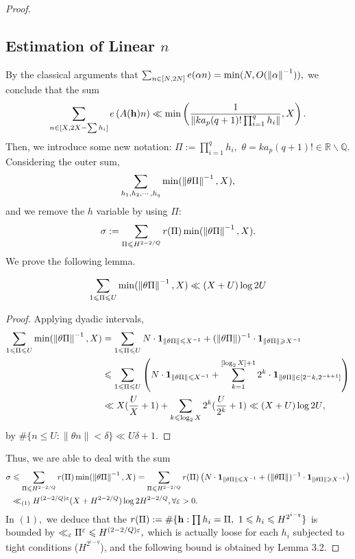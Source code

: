 \begin{proof}
\subsection{Estimation of Linear $n$}
By the classical arguments that $\sum_{n \in [N,2N]} e(\alpha n) = \min(N, O(\left\lVert \alpha \right\rVert^{-1})),$ we conclude that the sum $$\sum_{n \in [X,2X-\sum h_i]} e\left( A(\mathbf{h}) n \right) \ll \min \left( \frac{1}{\left\lVert ka_p (q+1)! \prod_{i=1}^q h_i \right\rVert}, X \right).$$ Then, we introduce some new notation: $\Pi := \prod_{i=1}^q h_i,$ $\theta = ka_p (q+1)! \in \mathbb{R} \backslash \mathbb{Q}.$ Considering the outer sum, $$\sum_{h_1,h_2, \cdots ,h_q} \min(\left\lVert \theta\Pi \right\rVert^{-1}, X),$$ and we remove the $h$ variable by using $\Pi$: $$\sigma := \sum_{\Pi \leqslant H^{2-2/Q}} r(\Pi) \min(\left\lVert \theta\Pi \right\rVert^{-1}, X).$$ We prove the following lemma.
\begin{lemma}
    $$\sum_{1 \leqslant \Pi \leqslant U} \min(\left\lVert \theta\Pi \right\rVert^{-1}, X) \ll (X+U)\log 2U$$
\end{lemma}
\begin{proof}
Applying dyadic intervals, 
\begin{align*}
    \sum_{1 \leqslant \Pi \leqslant U} \min(\left\lVert \theta\Pi \right\rVert^{-1}, X) &= \sum_{1 \leqslant \Pi \leqslant U} N \cdot \mathbf{1}_{\left\lVert \theta\Pi \right\rVert \leqslant X^{-1}} + (\left\lVert \theta\Pi \right\rVert)^{-1} \cdot \mathbf{1}_{\left\lVert \theta\Pi \right\rVert \geqslant X^{-1}} \\
    &\leqslant \sum_{1 \leqslant \Pi \leqslant U} \left( N \cdot \mathbf{1}_{\left\lVert \theta\Pi \right\rVert \leqslant X^{-1}} + \sum_{k = 1}^{[\log_2X]+1} 2^k \cdot \mathbf{1}_{\left\lVert \theta\Pi \right\rVert \in [2^-k,2^{-k+1}]} \right) \\ 
    &\ll X(\frac{U}{X}+1) + \sum_{k \leqslant \log_2X} 2^k (\frac{U}{2^k}+1) \ll (X+U)\log{2U},
\end{align*}
by $\#\{n\le U: \|\theta n\|<\delta\} \ll U\delta+1.$
\end{proof}

Thus, we are able to deal with the sum
\begin{align*}
    \sigma &\leqslant \sum_{\Pi \leqslant H^{2-2/Q}} r(\Pi) \min(\left\lVert \theta\Pi \right\rVert^{-1}, X) = \sum_{\Pi \leqslant H^{2-2/Q}} r(\Pi) \left( N \cdot \mathbf{1}_{\left\lVert \theta\Pi \right\rVert \leqslant X^{-1}} + (\left\lVert \theta\Pi \right\rVert)^{-1} \cdot \mathbf{1}_{\left\lVert \theta\Pi \right\rVert \geqslant X^{-1}} \right) \\
    &\ll_{(1)} H^{(2-2/Q)\varepsilon} (X+H^{2-2/Q}) \log{2H^{2-2/Q}}, \forall \varepsilon > 0.
\end{align*}
In $(1),$ we deduce that the $r(\Pi) := \#\{\mathbf{h} : \prod h_i = \Pi ,\ 1\leqslant h_i\leqslant H^{2^{i-q}}\}$ is bounded by $\ll_\varepsilon \Pi^\varepsilon \leqslant H^{(2-2/Q)\varepsilon},$ which is actually loose for each $h_i$ subjected to tight conditions ($H^{2^{i-q}}$), and the following bound is obtained by Lemma 3.2.


\end{proof}
